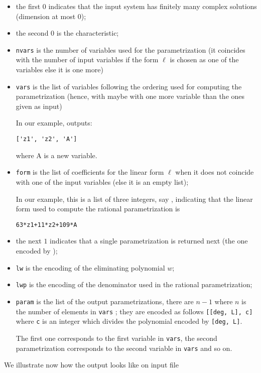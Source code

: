 \documentclass[a4paper,english,11pt]{scrartcl}
\def\tt{\ttfamily}
\theoremstyle{definition}
\theoremstyle{remark}
\begin{document}
\begin{itemize}
\item the first $0$ indicates that the input system has finitely
  many complex solutions (dimension at most $0$);
\item the second $0$ is the characteristic;
\item \texttt{nvars} is the number of variables used for the parametrization (it
  coincides with the number of input variables if the form $\ell$ is chosen
  as one of the variables else it is one more)
\item \texttt{vars} is the list of variables following the ordering used for
  computing the parametrization (hence, with maybe with one
  more variable than the ones given as input)

  In our example, \msolve outputs:
\begin{verbatim}
['z1', 'z2', 'A']
\end{verbatim}
where {\tt A} is a new variable. 

\item \texttt{form} is the list of coefficients for the linear form $\ell$ when
  it does not coincide with one of the input variables (else it is an empty list);

  In our example, this is a list of three integers, say {\tt [63, 11, 109]}, 
  indicating that the linear form used to compute the rational parametrization is 
\begin{verbatim}
63*z1+11*z2+109*A
\end{verbatim}
\item the next $1$ indicates that a single parametrization is returned next (the one encoded by {\tt [lw, lwp, param]});
\item \texttt{lw} is the encoding of the eliminating polynomial $w$;
\item \texttt{lwp} is the encoding of the denominator used in the rational
  parametrization;
\item \texttt{param} is the list of the output parametrizations, there are $n-1$ where 
    $n$ is the number of elements in \verb+vars+ ; 
    they are encoded as follows \verb+[[deg, L], c]+ where \verb+c+ is 
    an integer which divides the polynomial encoded by \verb+[deg, L]+. 

    The first one corresponds to the first variable in \verb+vars+, the 
    second parametrization corresponds to the second variable in \verb+vars+ 
    and so on.
\end{itemize}
We illustrate now how the output looks like on input file
\end{document}
